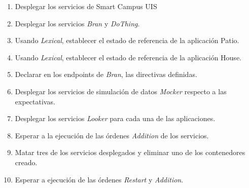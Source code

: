 \begin{enumerate}[itemsep=0mm]
    \item Desplegar los servicios de Smart Campus UIS
    \item Desplegar los servicios \textit{Bran} y \textit{DoThing}.
    \item Usando \textit{Lexical}, establecer el estado de referencia de la aplicación Patio. 
    \item Usando \textit{Lexical}, establecer el estado de referencia de la aplicación House. 
    \item Declarar en los endpoints de \textit{Bran}, las directivas definidas.
    \item Desplegar los servicios de simulación de datos \textit{Mocker} respecto a las expectativas.
    \item Desplegar los servicios \textit{Looker} para cada una de las aplicaciones.
    \item Esperar a la ejecución de las órdenes \textit{Addition} de los servicios.
    \item Matar tres de los servicios desplegados y eliminar uno de los contenedores creado.
    \item Esperar a ejecución de las órdenes \textit{Restart} y \textit{Addition}.
\end{enumerate}